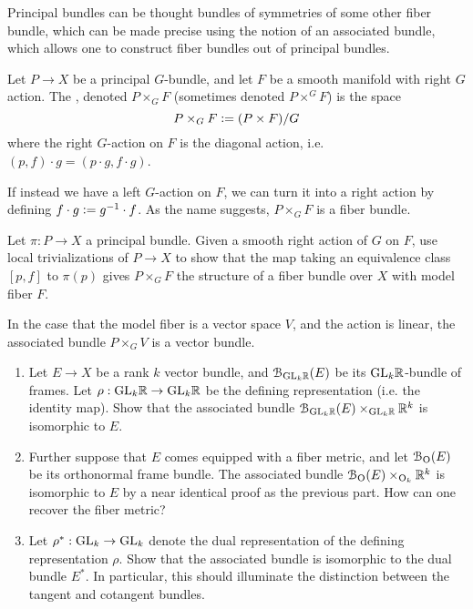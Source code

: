 Principal bundles can be thought bundles of symmetries of some other fiber bundle,
which can be made precise using the notion of an associated bundle, which allows
one to construct fiber bundles out of principal bundles.
%
\begin{defn}
Let $P \to X$ be a principal $G$-bundle, and let $F$ be a smooth manifold with
right $G$ action. The , denoted $P \times_G F$
(sometimes denoted $P \times^G F$) is the space
\[
P \times_G F \vcentcolon= (P \times F)/G
\]
where the right $G$-action on $F$ is the diagonal action, i.e.
$(p,f)\cdot g = (p\cdot g, f\cdot g)$.
\end{defn}
%
If instead we have a left $G$-action on $F$, we can turn it into a right action
by defining $f \cdot g \vcentcolon= g^{-1} \cdot f$. As the name suggests, $P \times_G F$ is
a fiber bundle.
%
\begin{exer}
Let $\pi : P \to X$ a principal bundle. Given a smooth right action of $G$ on
$F$, use local trivializations of $P \to X$ to show that the map taking an
equivalence class $[p,f]$ to $\pi(p)$ gives $P\times_G F$ the structure of a fiber
bundle over $X$ with model fiber $F$.
\end{exer}
%
In the case that the model fiber is a vector space $V$, and the action is
linear, the associated bundle $P \times_G V$ is a vector bundle.
%
\begin{exer} \enumbreak
\begin{enumerate}
  \item Let $E \to X$ be a rank $k$ vector bundle, and $\mathcal{B}_{\mathrm{GL}_k\mathbb{R}}(E)$ be its
  $\mathrm{GL}_k\mathbb{R}$-bundle of frames. Let $\rho : \mathrm{GL}_k\mathbb{R} \to \mathrm{GL}_k\mathbb{R}$ be the
  defining representation (i.e. the identity map). Show that the associated bundle
  $\mathcal{B}_{\mathrm{GL}_k\mathbb{R}}(E) \times_{\mathrm{GL}_k\mathbb{R}} \mathbb{R}^k$ is isomorphic to $E$.
  \item Further suppose that $E$ comes equipped with a fiber metric, and let
  $\mathcal{B}_{\mathrm{O}}(E)$  be its orthonormal frame bundle. The associated
  bundle $\mathcal{B}_{\mathrm{O}}(E) \times_{\mathrm{O}_k} \mathbb{R}^k$ is isomorphic to $E$
  by a near identical proof as the previous part. How can one recover the fiber
  metric?
  \item Let $\rho^* : \mathrm{GL}_k \to \mathrm{GL}_k$ denote the dual representation of the
  defining representation $\rho$. Show that the associated bundle
  is isomorphic to the dual bundle $E^*$. In particular, this should
  illuminate the distinction between the tangent and cotangent bundles.
\end{enumerate}
\end{exer}
